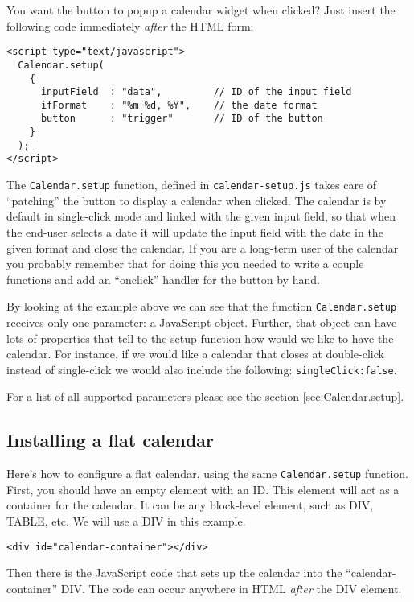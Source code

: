 \documentclass[a4paper,twoside,10pt]{dynadoc}
\begin{document}
\noindent You want the button to popup a calendar widget when clicked?  Just
insert the following code immediately \emph{after} the HTML form:

\begin{verbatim}
<script type="text/javascript">
  Calendar.setup(
    {
      inputField  : "data",         // ID of the input field
      ifFormat    : "%m %d, %Y",    // the date format
      button      : "trigger"       // ID of the button
    }
  );
</script>
\end{verbatim}

The \texttt{Calendar.setup} function, defined in \texttt{calendar-setup.js}
takes care of ``patching'' the button to display a calendar when clicked.  The
calendar is by default in single-click mode and linked with the given input
field, so that when the end-user selects a date it will update the input field
with the date in the given format and close the calendar.  If you are a
long-term user of the calendar you probably remember that for doing this you
needed to write a couple functions and add an ``onclick'' handler for the
button by hand.

By looking at the example above we can see that the function
\texttt{Calendar.setup} receives only one parameter: a JavaScript object.
Further, that object can have lots of properties that tell to the setup
function how would we like to have the calendar.  For instance, if we would
like a calendar that closes at double-click instead of single-click we would
also include the following: \texttt{singleClick:false}.

For a list of all supported parameters please see the section
\ref{sec:Calendar.setup}.

\subsection{Installing a flat calendar}\label{sec:quick-start-flat}

Here's how to configure a flat calendar, using the same \texttt{Calendar.setup}
function.  First, you should have an empty element with an ID.  This element
will act as a container for the calendar.  It can be any block-level element,
such as DIV, TABLE, etc.  We will use a DIV in this example.

\begin{verbatim}
<div id="calendar-container"></div>
\end{verbatim}

Then there is the JavaScript code that sets up the calendar into the
``calendar-container'' DIV.  The code can occur anywhere in HTML
\emph{after} the DIV element.
\end{document}
